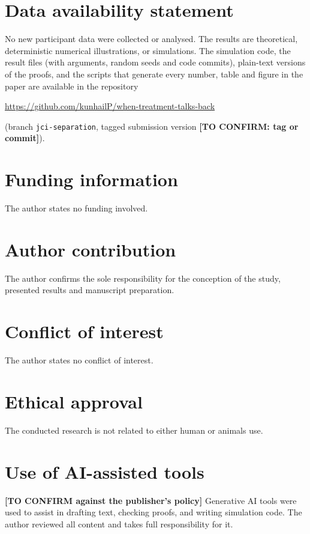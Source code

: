 \documentclass[12pt]{article}
\theoremstyle{definition}
\theoremstyle{remark}
\begin{document}
\section*{Data availability statement}
No new participant data were collected or analysed. The results are
theoretical, deterministic numerical illustrations, or simulations. The
simulation code, the result files (with arguments, random seeds and code
commits), plain-text versions of the proofs, and the scripts that generate
every number, table and figure in the paper are available in
the repository
\begin{center}\url{https://github.com/kunhailP/when-treatment-talks-back}\end{center}
(branch \texttt{jci-separation}, tagged submission version
\textbf{[TO CONFIRM: tag or commit]}).

\section*{Funding information}
The author states no funding involved.

\section*{Author contribution}
The author confirms the sole responsibility for the conception of the study,
presented results and manuscript preparation.

\section*{Conflict of interest}
The author states no conflict of interest.

\section*{Ethical approval}
The conducted research is not related to either human or animals use.

\section*{Use of AI-assisted tools}
\textbf{[TO CONFIRM against the publisher's policy]} Generative AI tools were
used to assist in drafting text, checking proofs, and writing simulation code.
The author reviewed all content and takes full responsibility for it.

\begingroup\sloppy


\endgroup

\appendix

\end{document}
